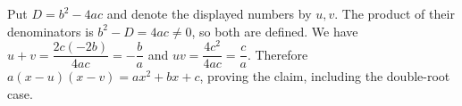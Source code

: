 Put $D=b^2-4ac$ and denote the displayed numbers by $u,v$. The product of their denominators is $b^2-D=4ac\ne0$, so both are defined. We have $u+v=\dfrac{2c(-2b)}{4ac}=-\dfrac{b}{a}$ and $uv=\dfrac{4c^2}{4ac}=\dfrac{c}{a}$. Therefore $a(x-u)(x-v)=ax^2+bx+c$, proving the claim, including the double-root case.
